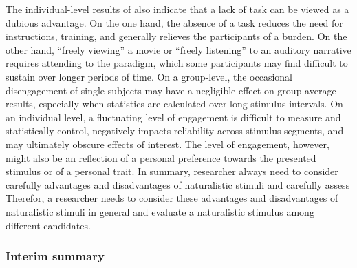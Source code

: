 
%
The individual-level results of \citet{haeusler2022processing} also indicate
that a lack of task can be viewed as a dubious advantage.
%
On the one hand, the absence of a task reduces the need for instructions,
training, and generally relieves the participants of a burden.
%
On the other hand, ``freely viewing'' a movie or ``freely listening'' to an
auditory narrative requires attending to the paradigm, which some participants
may find difficult to sustain over longer periods of time.
%
On a group-level, the occasional disengagement of single subjects may have a
negligible effect on group average results, especially when statistics are
calculated over long stimulus intervals.
%
On an individual level, a fluctuating level of engagement is difficult to
measure and statistically control, negatively impacts reliability across
stimulus segments, and may ultimately obscure effects of interest.
%
The level of engagement, however, might also be an reflection of a personal
preference towards the presented stimulus or of a personal trait.
%
In summary, researcher always need to consider carefully advantages and
disadvantages of naturalistic stimuli and carefully assess
%
Therefor, a researcher needs to consider these advantages and disadvantages of
naturalistic stimuli in general and evaluate a naturalistic stimulus among
different candidates.


\subsubsection{Interim summary}



